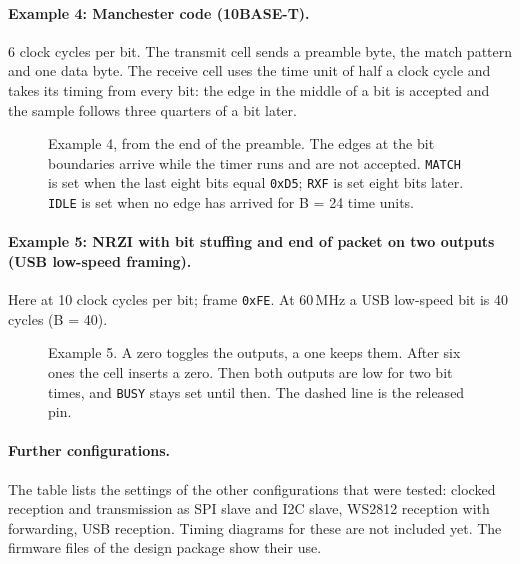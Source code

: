 \documentclass[10pt,a4paper]{article}
\newcommand{\reg}[1]{\texttt{#1}}
\begin{document}
\paragraph{Example 4: Manchester code (10BASE-T).} 6 clock cycles per bit. The transmit cell sends a preamble
byte, the match pattern and one data byte. The receive cell uses the time unit of half a clock cycle and takes
its timing from every bit: the edge in the middle of a bit is accepted and the sample follows three quarters of
a bit later.

{\small}

\begin{figure}[H]
\centering

\caption{Example 4, from the end of the preamble. The edges at the bit boundaries arrive while the timer runs
and are not accepted. \reg{MATCH} is set when the last eight bits equal \texttt{0xD5}; \reg{RXF} is set eight bits
later. \reg{IDLE} is set when no edge has arrived for B = 24 time units.}
\end{figure}

\paragraph{Example 5: NRZI with bit stuffing and end of packet on two outputs (USB low-speed framing).} Here at
10 clock cycles per bit; frame \texttt{0xFE}. At 60\,MHz a USB low-speed bit is 40 cycles (B = 40).

{\small}

\begin{figure}[H]
\centering

\caption{Example 5. A zero toggles the outputs, a one keeps them. After six ones the cell inserts a zero. Then
both outputs are low for two bit times, and \reg{BUSY} stays set until then. The dashed line is the released pin.}
\end{figure}

\paragraph{Further configurations.} The table lists the settings of the other configurations that were tested:
clocked reception and transmission as SPI slave and I2C slave, WS2812 reception with forwarding, USB reception.
Timing diagrams for these are not included yet. The firmware files of the design package show their use.
\end{document}
